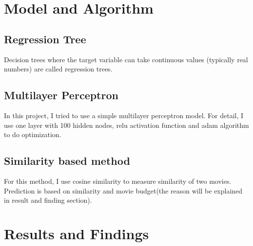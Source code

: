 \documentclass[UTF8]{article}
\begin{document}
\section{Model and Algorithm}
\subsection{Regression Tree}
Decision trees where the target variable can take continuous values
(typically real numbers) are called regression trees.

\subsection{Multilayer Perceptron}
In this project, I tried to use a simple multilayer perceptron model. For detail, I use
one layer with 100 hidden nodes, relu activation function and adam algorithm to do optimization.

\subsection{Similarity based method}
For this method, I use cosine similarity to measure similarity of two movies.
Prediction is based on similarity and movie budget(the reason will be explained in result and finding section).

\section{Results and Findings}
\end{document}
